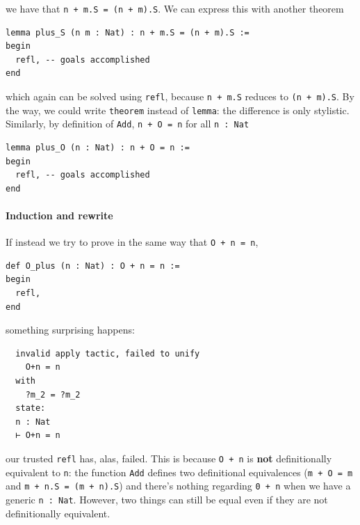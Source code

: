 \documentclass[oneside]{book}
\theoremstyle{definition}
\theoremstyle{remark}
\theoremstyle{plain}
\begin{document}
we have that \lstinline{n + m.S = (n + m).S}.
We can express this with another theorem
\begin{lstlisting}
lemma plus_S (n m : Nat) : n + m.S = (n + m).S :=
begin
  refl, -- goals accomplished
end
\end{lstlisting}
which again can be solved using \lstinline{refl}, because \lstinline{n + m.S} reduces to \lstinline{(n + m).S}.
By the way, we could write \lstinline{theorem} instead of \lstinline{lemma}: the difference is only stylistic.
Similarly, by definition of \lstinline{Add}, \lstinline{n + O = n} for all \lstinline{n : Nat}
\begin{lstlisting}
lemma plus_O (n : Nat) : n + O = n :=
begin
  refl, -- goals accomplished
end
\end{lstlisting}

\paragraph{Induction and rewrite}

If instead we try to prove in the same way that \lstinline{O + n = n},
\begin{lstlisting}
def O_plus (n : Nat) : O + n = n :=
begin
  refl,
end
\end{lstlisting}
something surprising happens:
\begin{lstlisting}
  invalid apply tactic, failed to unify
    O+n = n
  with
    ?m_2 = ?m_2
  state:
  n : Nat
  ⊢ O+n = n
\end{lstlisting}
our trusted \lstinline{refl} has, alas, failed.
This is because \lstinline{O + n} is \textbf{not} definitionally equivalent to \lstinline{n}:
the function \lstinline{Add} defines two definitional equivalences
(\lstinline{m + O = m} and \lstinline{m + n.S = (m + n).S})
and there's nothing regarding \lstinline{0 + n} when we have a generic \lstinline{n : Nat}.
However, two things can still be equal even if they are not definitionally equivalent.
\end{document}
